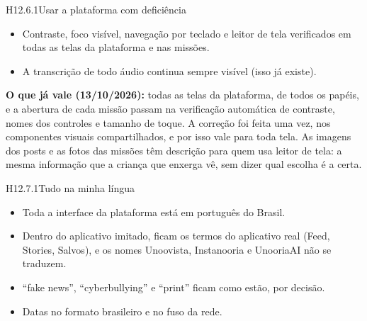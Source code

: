 
\begin{historia}{H12.6.1}{Usar a plataforma com deficiência}{\parcial}
\aceiteproposta
\begin{itemize}
  \item Contraste, foco visível, navegação por teclado e leitor de tela
    verificados em todas as telas da plataforma e nas missões.
  \item A transcrição de todo áudio continua sempre visível (isso já existe).
\end{itemize}
\textbf{O que já vale (13/10/2026):} todas as telas da plataforma, de todos
os papéis, e a abertura de cada missão passam na verificação automática de
contraste, nomes dos controles e tamanho de toque. A correção foi feita uma vez,
nos componentes visuais compartilhados, e por isso vale para toda tela.
As imagens dos posts e as fotos das missões têm descrição para quem usa leitor
de tela: a mesma informação que a criança que enxerga vê, sem dizer qual
escolha é a certa.
\end{historia}


\begin{historia}{H12.7.1}{Tudo na minha língua}{\pronto}
\aceite
\begin{itemize}
  \item Toda a interface da plataforma está em português do Brasil.
  \item Dentro do aplicativo imitado, ficam os termos do aplicativo real
    (Feed, Stories, Salvos), e os nomes Unoovista, Instanooria e UnooriaAI não se traduzem.
  \item \enquote{fake news}, \enquote{cyberbullying} e \enquote{print} ficam
    como estão, por decisão.
  \item Datas no formato brasileiro e no fuso da rede.
\end{itemize}
\end{historia}
